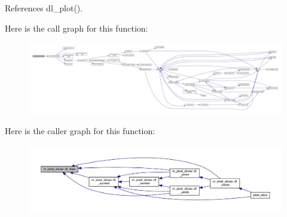 References dl\+\_\+plot().

Here is the call graph for this function\+:
\nopagebreak
\begin{figure}[H]
\begin{center}
\leavevmode
\includegraphics[width=350pt]{namespacem__pixel__slices_acafdf0174290a0e231ca120f6305b5d0_cgraph}
\end{center}
\end{figure}
Here is the caller graph for this function\+:
\nopagebreak
\begin{figure}[H]
\begin{center}
\leavevmode
\includegraphics[width=350pt]{namespacem__pixel__slices_acafdf0174290a0e231ca120f6305b5d0_icgraph}
\end{center}
\end{figure}
\mbox{\label{namespacem__pixel__slices_aa0de53a25754eab8fff1732aa2f93eba}} 
